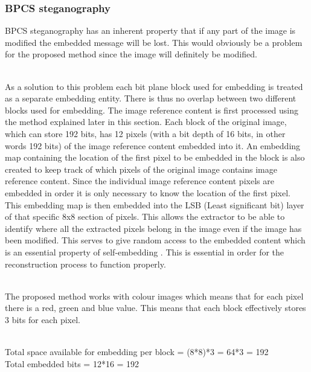 \documentclass[12pt]{article}
\begin{document}
\subsubsection{BPCS steganography} 
\label{bpcsSteg}

BPCS steganography has an inherent property that if any part of the image is modified the embedded message will be lost.
This would obviously be a problem for the proposed method since the image will definitely be modified.

\hspace{0pt} \\
As a solution to this problem each bit plane block used for embedding is treated as a separate embedding entity.
There is thus no overlap between two different blocks used for embedding.
The image reference content is first processed using the method explained later in this section.
Each block of the original image, which can store 192 bits, has 12 pixels (with a bit depth of 16 bits, in other words 192 bits) of the image reference content embedded into it.
An embedding map containing the location of the first pixel to be embedded in the block is also created to keep track of which pixels of the original image contains image reference content.
Since the individual image reference content pixels are embedded in order it is only necessary to know the location of the first pixel.
This embedding map is then embedded into the LSB (Least significant bit) layer of that specific 8x8 section of pixels. 
This allows the extractor to be able to identify where all the extracted pixels belong in the image even if the image has been modified.
This serves to give random access to the embedded content which is an essential property of self-embedding \cite{korus2013efficient}.
This is essential in order for the reconstruction process to function properly.

\hspace{0pt} \\
The proposed method works with colour images which means that for each pixel there is a red, green and blue value. This means that each block effectively stores 3 bits for each pixel.

\hspace{0pt} \\
Total space available for embedding per block = (8*8)*3 = 64*3 = 192
\hspace{0pt} \\
Total embedded bits = 12*16 = 192
\end{document}
